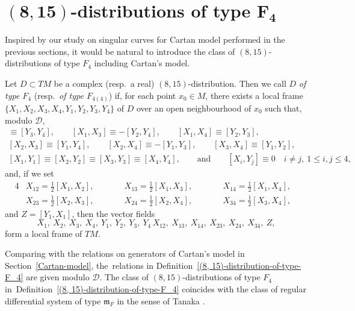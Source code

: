 \documentclass[pdftex]{sigma}
\numberwithin{equation}{section}
\theoremstyle{definition}
\newcommand{\0}{\boldsymbol{0}}
\begin{document}
\section[(8,15)-distributions of type F\_4]{$\boldsymbol{(8,15)}$-distributions of type $\boldsymbol{F_4}$}
\label{$(8, 15)$-distributions of type $F_4$}

Inspired by our study on singular curves for Cartan model performed in the previous sections,
it would be natural to introduce the class of $(8, 15)$-distributions of type $F_4$ including Cartan's model.

\begin{Definition}
\label{(8, 15)-distribution-of-type-F_4}
Let $D \subset TM$ be a complex (resp.\ a real) $(8, 15)$-distribution.
Then we call $D$ {\it of type $F_4$} (resp.\ {\it of type $F_{4(4)}$})
if, for each point $x_0 \in M$, there exists a local frame $\{ X_1, X_2, X_3, X_4,
Y_1, Y_2, Y_3, Y_4\}$ of $D$ over an open neighbourhood of $x_0$ such that, modulo ${\mathcal D}$,
\begin{gather*}
[X_1, X_2] \equiv [Y_3, Y_4], \qquad [X_1, X_3] \equiv -[Y_2, Y_4], \qquad [X_1, X_4] \equiv [Y_2, Y_3],
\\
[X_2, X_3] \equiv [Y_1, Y_4], \qquad [X_2, X_4] \equiv -[Y_1, Y_3], \qquad [X_3, X_4] \equiv [Y_1, Y_2],
\\
[X_1, Y_1] \equiv [X_2, Y_2] \equiv [X_3, Y_3] \equiv [X_4, Y_4],
\qquad {\text{and}} \qquad [X_i, Y_j] \equiv 0 \quad i \not= j, \ 1 \leq i, j \leq 4,
\end{gather*}
and, if we set
\begin{alignat*}{4}
&X_{12} = \frac{1}{2}[X_1, X_2],\qquad&& X_{13} = \frac{1}{2}[X_1, X_3],\qquad&& X_{14} = \frac{1}{2}[X_1, X_4],&\\
&X_{23} = \frac{1}{2}[X_2, X_3],\qquad&& X_{24} = \frac{1}{2}[X_2, X_4],\qquad&& X_{34} = \frac{1}{2}[X_3, X_4],&
\end{alignat*}
and $Z = [Y_1, X_1]$,
then the vector fields
\[
X_1,\ X_2,\ X_3,\ X_4,\ Y_1,\ Y_2,\ Y_3,\ Y_4\, X_{12},\ X_{13},\ X_{14},\ X_{23},\ X_{24},\ X_{34},\ Z,
\]
form a local frame of $TM$.
\end{Definition}

\begin{Remark}
Comparing with the relations on generators of Cartan's model in Section~\ref{Cartan-model},
the~relations in Definition~\ref{(8, 15)-distribution-of-type-F_4} are given modulo ${\mathcal D}$.
The class of $(8, 15)$-distributions of type $F_4$ in~Definition~\ref{(8, 15)-distribution-of-type-F_4}
coincides with the class of regular differential system of type ${\mathfrak m}_F$ in the sense of
Tanaka \cite{Tanaka1, Tanaka2, Yamaguchi}.
\end{Remark}
\end{document}
